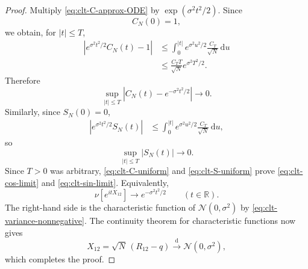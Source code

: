 \begin{proof}
Multiply \eqref{eq:clt-C-approx-ODE} by
$\exp(\sigma^2t^2/2)$.  Since
\[
 C_N(0)=1,
\]
we obtain, for $|t|\le T$,
\begin{align*}
 \left|
 e^{\sigma^2t^2/2}C_N(t)-1
 \right|
 &\le
 \int_0^{|t|}
 e^{\sigma^2u^2/2}
 \frac{C_T}{\sqrt N}\,\mathrm du\\
 &\le
 \frac{C_TT}{\sqrt N}
 e^{\sigma^2T^2/2}.
\end{align*}
Therefore
\begin{equation}
 \sup_{|t|\le T}
 \left|
 C_N(t)-e^{-\sigma^2t^2/2}
 \right|
 \longrightarrow0.
 \label{eq:clt-C-uniform}
\end{equation}
Similarly, since $S_N(0)=0$,
\begin{align*}
 \left|
 e^{\sigma^2t^2/2}S_N(t)
 \right|
 &\le
 \int_0^{|t|}
 e^{\sigma^2u^2/2}
 \frac{C_T}{\sqrt N}\,\mathrm du,
\end{align*}
so
\begin{equation}
 \sup_{|t|\le T}|S_N(t)|
 \longrightarrow0.
 \label{eq:clt-S-uniform}
\end{equation}
Since $T>0$ was arbitrary,
\eqref{eq:clt-C-uniform} and \eqref{eq:clt-S-uniform} prove
\eqref{eq:clt-cos-limit} and \eqref{eq:clt-sin-limit}.  Equivalently,
\[
 \nu[e^{itX_{12}}]
 \longrightarrow
 e^{-\sigma^2t^2/2}
 \qquad(t\in\mathbb R).
\]
The right-hand side is the characteristic function of
$\mathcal N(0,\sigma^2)$ by
\eqref{eq:clt-variance-nonnegative}.  The continuity theorem for
characteristic functions now gives
\[
 X_{12}
 =
 \sqrt N\,(R_{12}-q)
 \xrightarrow{\mathrm d}
 \mathcal N(0,\sigma^2),
\]
which completes the proof.
\end{proof}
